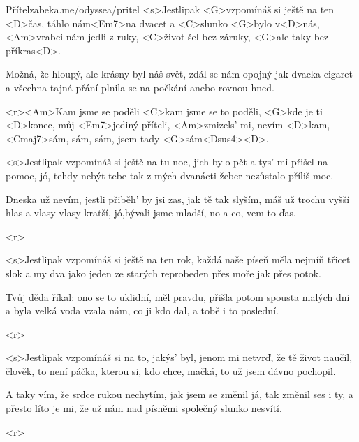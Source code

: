 \begin{song}{27}{Přítel}{zabeka.me/odyssea/pritel}
<s>Jestlipak <G>vzpomínáš si ještě na ten <D>čas,
táhlo nám<Em7>na dvacet a <C>slunko <G>bylo v<D>nás,
<Am>vrabci nám jedli z ruky,
<C>život šel bez záruky,
<G>ale taky bez příkras<D>.

Možná, že hloupý, ale krásny byl náš svět,
zdál se nám opojný jak dvacka cigaret
a všechna tajná přání
plnila se na počkání anebo rovnou hned.

<r><Am>Kam jsme se poděli
<C>kam jsme se to poděli,
<G>kde je ti <D>konec, můj <Em7>jediný příteli,
<Am>zmizels' mi, nevím <D>kam,
<Cmaj7>sám, sám, sám, jsem tady <G>sám<Dsus4><D>.

<s>Jestlipak vzpomínáš si ještě na tu noc,
jich bylo pět a tys' mi přišel na pomoc,
jó, tehdy nebýt tebe tak z mých
dvanácti žeber nezůstalo příliš moc.

Dneska už nevím, jestli přiběh' by jsi zas,
jak tě tak slyším, máš už trochu vyšší hlas
a vlasy vlasy kratší, jó,bývali jsme mladší,
no a co, vem to ďas.

<r>

<s>Jestlipak vzpomínáš si ještě na ten rok,
každá naše píseň měla nejmíň třicet slok
a my dva jako jeden ze starých reprobeden
přes moře jak přes potok.

Tvůj děda říkal: ono se to uklidní,
měl pravdu, přišla potom spousta malých dni
a byla velká voda vzala nám, co ji kdo dal,
a tobě i to poslední.

<r>

<s>Jestlipak vzpomínáš si na to, jakýs' byl,
jenom mi netvrď, že tě život naučil,
člověk, to není páčka,
kterou si, kdo chce, mačká,
to už jsem dávno pochopil.

A taky vím, že srdce rukou nechytím,
jak jsem se změnil já, tak změnil ses i ty,
a přesto líto je mi, že už nám nad písněmi
společný slunko nesvítí.

<r>

\end{song}
